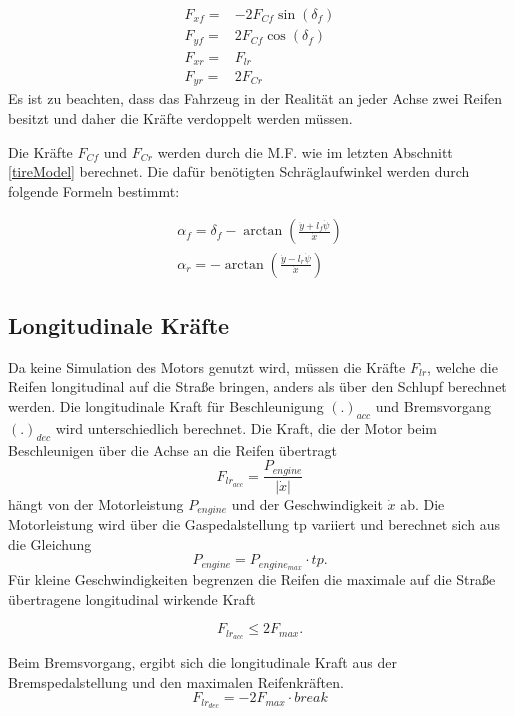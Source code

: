 \documentclass{like}
\begin{document}
\begin{eqnarray}
F_{xf} =& - 2 F_{Cf} \sin(\delta_f) \\
F_{yf} =& 2 F_{Cf} \cos(\delta_f) \\
F_{xr} =&   F_{lr} \\
F_{yr} =& 2 F_{Cr}
\end{eqnarray}
Es ist zu beachten, dass das Fahrzeug in der Realität an jeder Achse zwei Reifen besitzt und daher die Kräfte verdoppelt werden müssen.


Die Kräfte \(F_{Cf}\) und \(F_{Cr}\) werden durch die \ac{M.F.} wie im letzten Abschnitt \ref{tireModel} berechnet.
Die dafür benötigten Schräglaufwinkel werden durch folgende Formeln bestimmt:

\begin{eqnarray}
\alpha_f = \delta_f - \arctan \left(\frac{\dot{y} + l_f \dot{\psi}}{\dot{x}} \right) \\
\alpha_r = - \arctan \left(\frac{\dot{y} - l_r \dot{\psi}}{\dot{x}} \right)
\end{eqnarray}

\subsection*{Longitudinale Kräfte}
Da keine Simulation des Motors genutzt wird, müssen die Kräfte \(F_{lr}\), welche die Reifen longitudinal auf die Straße bringen, anders als über den Schlupf berechnet werden.
Die longitudinale Kraft für Beschleunigung \((.)_{acc}\) und Bremsvorgang \((.)_{dec}\) wird unterschiedlich berechnet. Die Kraft, die der Motor beim Beschleunigen über die Achse an die Reifen übertragt
\begin{equation}
	F_{lr_{acc}} = \frac{P_{engine}}{|\dot{x}|} \label{long_dyn_engine}
\end{equation}
hängt von der Motorleistung $P_{engine}$ und der Geschwindigkeit $\dot{x}$ ab. Die Motorleistung wird über die Gaspedalstellung tp variiert und berechnet sich aus die Gleichung 
\begin{equation}
P_{engine} = P_{engine_{max}} \cdot tp.
\end{equation}
Für kleine Geschwindigkeiten begrenzen die Reifen die maximale auf die Straße übertragene longitudinal wirkende Kraft 

\begin{equation}
	F_{lr_{acc}}\leq 2 F_{max} \label{long_dyn_max}.
\end{equation}

Beim Bremsvorgang, ergibt sich die longitudinale Kraft aus der Bremspedalstellung und den maximalen Reifenkräften.
\begin{equation}
F_{lr_{dec}} = - 2 F_{max} \cdot break
\end{equation} 
\end{document}
